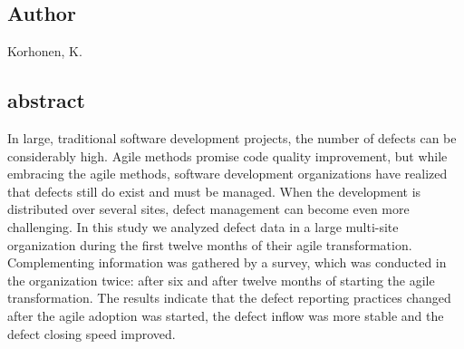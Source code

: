 \documentclass[lnbip,sechang,a4paper]{svmultln}
\begin{document}
\subsection{Author}
Korhonen, K.
\subsection{abstract}
In large, traditional software development projects, the number of defects can
be considerably high. Agile methods promise code quality improvement, but while
embracing the agile methods, software development organizations have realized that defects still do exist and must be managed. When the development is distributed over several sites, defect management can become even more challenging. In this study we analyzed defect data in a large multi-site organization during the first twelve months of their agile transformation. Complementing information was gathered by a survey, which was conducted in the organization twice: after six and after twelve months of starting the agile transformation. The results indicate that the defect reporting practices changed after the agile adoption was started, the defect inflow was more stable and the defect closing speed improved.
\cite{5654786}

\end{document}
